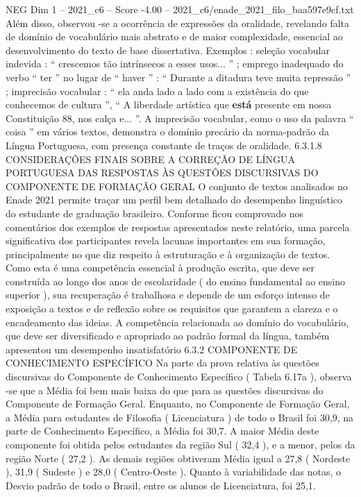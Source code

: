 \begin{textsample}{NEG Dim 1 – 2021\_c6 – Score -4.00 – 2021\_c6/enade\_2021\_filo\_baa597e9cf.txt}
Além disso, observou -se a ocorrência de expressões da oralidade, revelando falta de domínio de vocabulário mais abstrato e de maior complexidade, essencial ao desenvolvimento do texto de base dissertativa.
Exemplos : seleção vocabular indevida : “ crescemos tão intrínsecos a esses usos... ” ; emprego inadequado do verbo “ ter ” no lugar de “ haver ” : “ Durante a ditadura teve muita repressão ” ; imprecisão vocabular : “ ela anda lado a lado com a existência do que conhecemos de cultura ”, “ A liberdade artística que \textbf{está} presente em nossa Constituição 88, nos calça e... ”.
A imprecisão vocabular, como o uso da palavra “ coisa ” em vários textos, demonstra o domínio precário da norma-padrão da Língua Portuguesa, com presença constante de traços de oralidade. 6.3.1.8 CONSIDERAÇÕES FINAIS SOBRE A CORREÇÃO DE LÍNGUA PORTUGUESA DAS RESPOSTAS ÀS QUESTÕES DISCURSIVAS DO COMPONENTE DE FORMAÇÃO GERAL O conjunto de textos analisados no Enade 2021 permite traçar um perfil bem detalhado do desempenho linguístico do estudante de graduação brasileiro.
Conforme ficou comprovado nos comentários dos exemplos de respostas apresentados neste relatório, uma parcela significativa dos participantes revela lacunas importantes em sua formação, principalmente no que diz respeito à estruturação e à organização de textos.
Como esta é uma competência essencial à produção escrita, que deve ser construída ao longo dos anos de escolaridade ( do ensino fundamental ao ensino superior ), sua recuperação é trabalhosa e depende de um esforço intenso de exposição a textos e de reflexão sobre os requisitos que garantem a clareza e o encadeamento das ideias.
A competência relacionada ao domínio do vocabulário, que deve ser diversificado e apropriado ao padrão formal da língua, também apresentou um desempenho insatisfatório 6.3.2 COMPONENTE DE CONHECIMENTO ESPECÍFICO Na parte da prova relativa às questões discursivas do Componente de Conhecimento Específico ( Tabela 6.17a ), observa -se que a Média foi bem mais baixa do que para as questões discursivas do Componente de Formação Geral.
Enquanto, no Componente de Formação Geral, a Média para estudantes de Filosofia ( Licenciatura ) de todo o Brasil foi 30,9, na parte de Conhecimento Específico, a Média foi 30,7.
A maior Média deste componente foi obtida pelos estudantes da região Sul ( 32,4 ), e a menor, pelos da região Norte ( 27,2 ).
As demais regiões obtiveram Média igual a 27,8 ( Nordeste ), 31,9 ( Sudeste ) e 28,0 ( Centro-Oeste ).
Quanto à variabilidade das notas, o Desvio padrão de todo o Brasil, entre os alunos de Licenciatura, foi 25,1.

\end{textsample}

